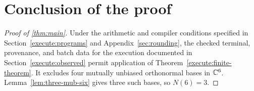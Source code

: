 \section{Conclusion of the proof}\label{sec:conclusion}

\begin{proof}[Proof of \cref{thm:main}]
Under the arithmetic and compiler conditions specified in
Section~\ref{execute:programs} and Appendix~\ref{sec:rounding}, the
checked terminal, provenance, and batch data for the execution
documented in Section~\ref{execute:observed} permit application of
Theorem~\ref{execute:finite-theorem}. It excludes four mutually unbiased orthonormal bases in
$\mathbb C^6$. Lemma~\ref{lem:three-mub-six} gives three such bases, so
$N(6)=3$.
\end{proof}
